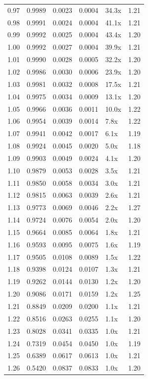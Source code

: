 \begin{tabular}{rrrrlr}
0.97 & 0.9989 & 0.0023 & 0.0004 & 34.3x & 1.21 \\
0.98 & 0.9991 & 0.0024 & 0.0004 & 41.1x & 1.21 \\
0.99 & 0.9992 & 0.0025 & 0.0004 & 43.4x & 1.20 \\
1.00 & 0.9992 & 0.0027 & 0.0004 & 39.9x & 1.21 \\
1.01 & 0.9990 & 0.0028 & 0.0005 & 32.2x & 1.20 \\
1.02 & 0.9986 & 0.0030 & 0.0006 & 23.9x & 1.20 \\
1.03 & 0.9981 & 0.0032 & 0.0008 & 17.5x & 1.21 \\
1.04 & 0.9975 & 0.0034 & 0.0009 & 13.1x & 1.20 \\
1.05 & 0.9966 & 0.0036 & 0.0011 & 10.0x & 1.22 \\
1.06 & 0.9954 & 0.0039 & 0.0014 & 7.8x & 1.22 \\
1.07 & 0.9941 & 0.0042 & 0.0017 & 6.1x & 1.19 \\
1.08 & 0.9924 & 0.0045 & 0.0020 & 5.0x & 1.18 \\
1.09 & 0.9903 & 0.0049 & 0.0024 & 4.1x & 1.20 \\
1.10 & 0.9879 & 0.0053 & 0.0028 & 3.5x & 1.21 \\
1.11 & 0.9850 & 0.0058 & 0.0034 & 3.0x & 1.21 \\
1.12 & 0.9815 & 0.0063 & 0.0039 & 2.6x & 1.21 \\
1.13 & 0.9773 & 0.0069 & 0.0046 & 2.2x & 1.27 \\
1.14 & 0.9724 & 0.0076 & 0.0054 & 2.0x & 1.20 \\
1.15 & 0.9664 & 0.0085 & 0.0064 & 1.8x & 1.21 \\
1.16 & 0.9593 & 0.0095 & 0.0075 & 1.6x & 1.19 \\
1.17 & 0.9505 & 0.0108 & 0.0089 & 1.5x & 1.22 \\
1.18 & 0.9398 & 0.0124 & 0.0107 & 1.3x & 1.21 \\
1.19 & 0.9262 & 0.0144 & 0.0130 & 1.2x & 1.20 \\
1.20 & 0.9086 & 0.0171 & 0.0159 & 1.2x & 1.25 \\
1.21 & 0.8849 & 0.0209 & 0.0200 & 1.1x & 1.21 \\
1.22 & 0.8516 & 0.0263 & 0.0255 & 1.1x & 1.20 \\
1.23 & 0.8028 & 0.0341 & 0.0335 & 1.0x & 1.21 \\
1.24 & 0.7319 & 0.0454 & 0.0450 & 1.0x & 1.19 \\
1.25 & 0.6389 & 0.0617 & 0.0613 & 1.0x & 1.21 \\
1.26 & 0.5420 & 0.0837 & 0.0833 & 1.0x & 1.20 \\

\end{tabular}
